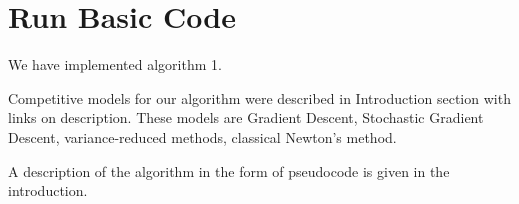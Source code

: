 \documentclass{article}
\begin{document}
\section{Run Basic Code}
We have implemented algorithm 1. 

Competitive models for our algorithm were described in Introduction section with links on description. These models are  Gradient Descent, Stochastic Gradient Descent, variance-reduced methods, classical Newton's method.

A description of the algorithm in the form of pseudocode is given in the introduction.


\newpage
{}

\printbibliography
\end{document}

